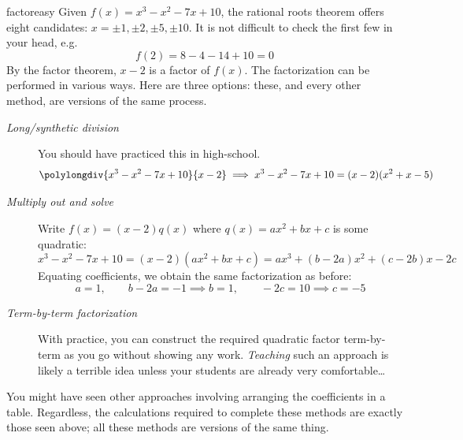 \begin{example}{}{factoreasy}
	Given $f(x)=x^3-x^2-7x+10$, the rational roots theorem offers eight candidates: $x=\pm 1,\pm 2,\pm 5,\pm 10$. It is not difficult to check the first few in your head, e.g.
	\[
		f(2)=8-4-14+10=0
	\]
	By the factor theorem, $x-2$ is a factor of $f(x)$. The factorization can be performed in various ways. Here are three options: these, and every other method, are versions of the same process.
	\begin{description}
		\item[\normalfont\emph{Long/synthetic division}]\lstsp You should have practiced this in high-school.
	  \[
	  	\polylongdiv{x^3-x^2-7x+10}{x-2} \implies x^3-x^2-7x+10=(x-2)(x^2+x-5)
	  \]
	  \item[\normalfont\emph{Multiply out and solve}]\lstsp Write $f(x)=(x-2)q(x)$ where $q(x)=ax^2+bx+c$ is some quadratic:
	  \[
	  	x^3-x^2-7x+10=(x-2)(ax^2+bx+c) =ax^3+(b-2a)x^2+(c-2b)x-2c
	  \]
	  Equating coefficients, we obtain the same factorization as before:
	  \[
	  	a=1,\qquad b-2a=-1\implies b=1,\qquad -2c=10\implies c=-5
	  \]
	  
	  \item[\normalfont\emph{Term-by-term factorization}]\lstsp With practice, you can construct the required quadratic factor term-by-term as you go without showing any work. \emph{Teaching} such an approach is likely a terrible idea unless your students are already very comfortable\ldots
	\end{description}
	
	You might have seen other approaches involving arranging the coefficients in a table. Regardless, the calculations required to complete these methods are exactly those seen above; all these methods are versions of the same thing.
\end{example}



